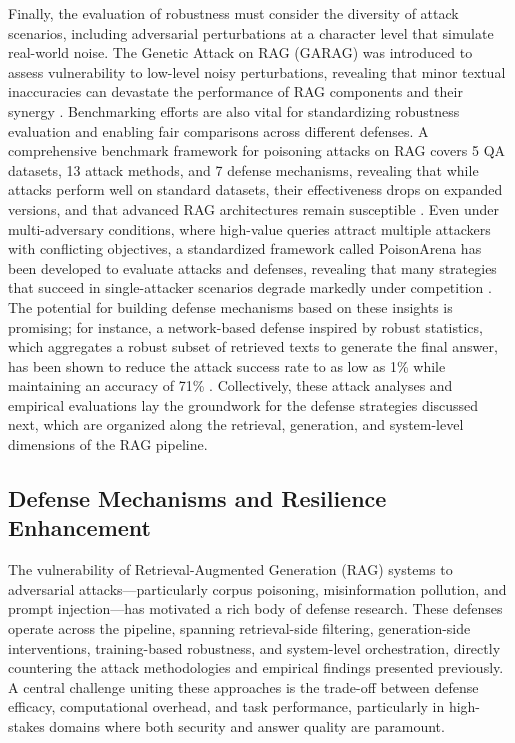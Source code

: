 \documentclass[11pt]{article}
\begin{document}
Finally, the evaluation of robustness must consider the diversity of attack scenarios, including adversarial perturbations at a character level that simulate real-world noise. The Genetic Attack on RAG (GARAG) was introduced to assess vulnerability to low-level noisy perturbations, revealing that minor textual inaccuracies can devastate the performance of RAG components and their synergy \cite{ref438}. Benchmarking efforts are also vital for standardizing robustness evaluation and enabling fair comparisons across different defenses. A comprehensive benchmark framework for poisoning attacks on RAG covers 5 QA datasets, 13 attack methods, and 7 defense mechanisms, revealing that while attacks perform well on standard datasets, their effectiveness drops on expanded versions, and that advanced RAG architectures remain susceptible \cite{ref439}. Even under multi-adversary conditions, where high-value queries attract multiple attackers with conflicting objectives, a standardized framework called PoisonArena has been developed to evaluate attacks and defenses, revealing that many strategies that succeed in single-attacker scenarios degrade markedly under competition \cite{ref440}. The potential for building defense mechanisms based on these insights is promising; for instance, a network-based defense inspired by robust statistics, which aggregates a robust subset of retrieved texts to generate the final answer, has been shown to reduce the attack success rate to as low as 1\% while maintaining an accuracy of 71\% \cite{ref441}. Collectively, these attack analyses and empirical evaluations lay the groundwork for the defense strategies discussed next, which are organized along the retrieval, generation, and system-level dimensions of the RAG pipeline.

\subsection{Defense Mechanisms and Resilience Enhancement}

The vulnerability of Retrieval-Augmented Generation (RAG) systems to adversarial attacks---particularly corpus poisoning, misinformation pollution, and prompt injection---has motivated a rich body of defense research. These defenses operate across the pipeline, spanning retrieval-side filtering, generation-side interventions, training-based robustness, and system-level orchestration, directly countering the attack methodologies and empirical findings presented previously. A central challenge uniting these approaches is the trade-off between defense efficacy, computational overhead, and task performance, particularly in high-stakes domains where both security and answer quality are paramount.
\end{document}
